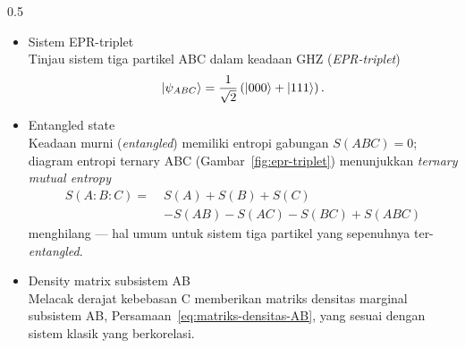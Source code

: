 \begin{frame}
\begin{columns}[T]
        \begin{column}{0.5\textwidth}
            \begin{itemize}\tiny\justifying
                \item[$\Rightarrow$] Sistem EPR-triplet \\
                    Tinjau sistem tiga partikel ABC dalam keadaan GHZ
                    (\textit{EPR-triplet})
                    \begin{equation}
                        \ket{\psi_{ABC}}=\frac{1}{\sqrt{2}}\left(\ket{000}+\ket{111}\right).
                    \end{equation}
                \item[$\Rightarrow$] Entangled state \\
                    Keadaan murni (\textit{entangled}) memiliki entropi gabungan
                    $S(ABC)=0$; diagram entropi ternary ABC
                    (Gambar~\ref{fig:epr-triplet}) menunjukkan \textit{ternary
                    mutual entropy}
                    \begin{equation}
                        \begin{aligned}
                            S(A{:}B{:}C)=\; & S(A)+S(B)+S(C)\\
                            & -S(AB)-S(AC)-S(BC)+S(ABC)
                        \end{aligned}
                    \end{equation}
                    menghilang --- hal umum untuk sistem tiga partikel yang
                    sepenuhnya ter-\textit{entangled}.
                \item[$\Rightarrow$] Density matrix subsistem AB \\
                    Melacak derajat kebebasan C memberikan matriks densitas
                    marginal subsistem AB,
                    Persamaan~\ref{eq:matriks-densitas-AB}, yang sesuai dengan
                    sistem klasik yang berkorelasi.
            \end{itemize}
        \end{column}
    \end{columns}
\end{frame}

